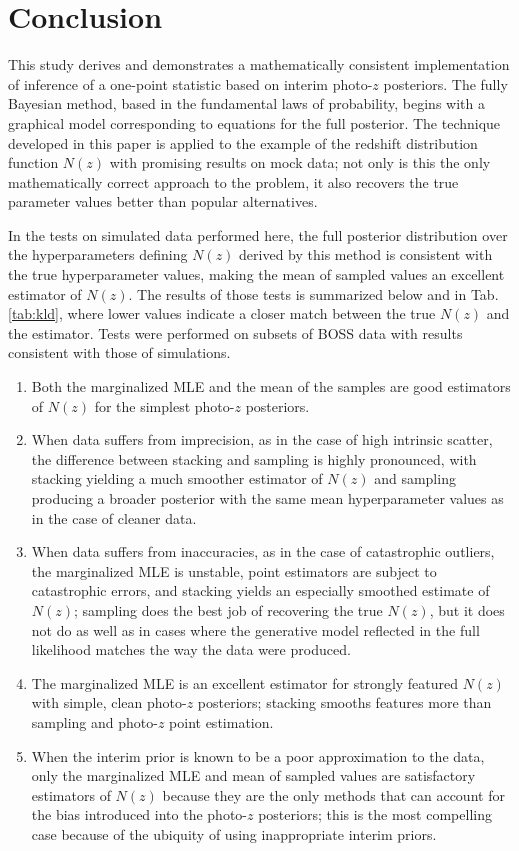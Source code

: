 \documentclass[preprint]{aastex}
\begin{document}
\section{Conclusion}
\label{sec:con}

This study derives and demonstrates a mathematically consistent implementation 
of inference of a one-point statistic based on interim photo-$z$ posteriors.  
The fully Bayesian method, based in the fundamental laws of probability, begins 
with a graphical model corresponding to equations for the full posterior.  The 
technique developed in this paper is applied to the example of the redshift 
distribution function $N(z)$ with promising results on mock data; not only is 
this the only mathematically correct approach to the problem, it also recovers 
the true parameter values better than popular alternatives.  

In the tests on simulated data performed here, the full posterior distribution 
over the hyperparameters defining $N(z)$ derived by this method is consistent 
with the true hyperparameter values, making the mean of sampled values an 
excellent estimator of $N(z)$.  The results of those tests is summarized below 
and in Tab. \ref{tab:kld}, where lower values indicate a closer match between 
the true $N(z)$ and the estimator.  Tests were performed on subsets of BOSS 
data with results consistent with those of simulations.

\begin{enumerate}
\item Both the marginalized MLE and the mean of the samples are good estimators 
of $N(z)$ for the simplest photo-$z$ posteriors.
\item When data suffers from imprecision, as in the case of high intrinsic 
scatter, the difference between stacking and sampling is highly pronounced, 
with stacking yielding a much smoother estimator of $N(z)$ and sampling 
producing a broader posterior with the same mean hyperparameter values as in 
the case of cleaner data.
\item When data suffers from inaccuracies, as in the case of catastrophic 
outliers, the marginalized MLE is unstable, point estimators are subject to 
catastrophic errors, and stacking yields an especially smoothed estimate of 
$N(z)$; sampling does the best job of recovering the true $N(z)$, but it does 
not do as well as in cases where the generative model reflected in the full 
likelihood matches the way the data were produced.
\item The marginalized MLE is an excellent estimator for strongly featured 
$N(z)$ with simple, clean photo-$z$ posteriors; stacking smooths features more 
than sampling and photo-$z$ point estimation.
\item When the interim prior is known to be a poor approximation to the data, 
only the marginalized MLE and mean of sampled values are satisfactory 
estimators of $N(z)$ because they are the only methods that can account for the 
bias introduced into the photo-$z$ posteriors; this is the most compelling case 
because of the ubiquity of using inappropriate interim priors.
\end{enumerate}
\end{document}
